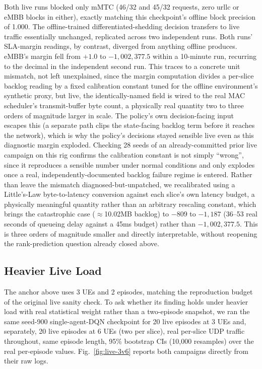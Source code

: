 \documentclass[pdflatex,sn-basic,Numbered]{sn-jnl}%
\begin{document}
Both live runs blocked only mMTC (46/32 and 45/32 requests, zero urllc or eMBB blocks in either), exactly matching this checkpoint's offline block precision of 1.000. The offline-trained differentiated-shedding decision transfers to live traffic essentially unchanged, replicated across two independent runs. Both runs' SLA-margin readings, by contrast, diverged from anything offline produces. eMBB's margin fell from $+1.0$ to $-1{,}002{,}377.5$ within a 10-minute run, recurring to the decimal in the independent second run. This traces to a concrete unit mismatch, not left unexplained, since the margin computation divides a per-slice backlog reading by a fixed calibration constant tuned for the offline environment's synthetic proxy, but live, the identically-named field is wired to the real MAC scheduler's transmit-buffer byte count, a physically real quantity two to three orders of magnitude larger in scale. The policy's own decision-facing
input escapes this (a separate path clips the state-facing backlog
term before it reaches the network), which is why the policy's
decisions stayed sensible live even as this diagnostic margin
exploded. Checking 28 seeds of an already-committed prior live campaign on this rig confirms the calibration constant is not simply ``wrong'', since it reproduces a sensible number under normal conditions and only explodes once a real, independently-documented backlog failure regime is entered. Rather than leave the mismatch diagnosed-but-unpatched, we recalibrated using a Little's-Law byte-to-latency conversion against each slice's own latency budget, a physically meaningful quantity rather than an arbitrary rescaling constant, which brings the catastrophic case ($\approx$10.02MB backlog) to $-809$ to $-1{,}187$ (36--53 real seconds of queueing delay against a 45ms budget) rather than $-1{,}002{,}377.5$. This is three orders of magnitude smaller and directly interpretable, without reopening the rank-prediction question already closed above.

\subsection{Heavier Live Load}
\label{sec:results-m8-load}
The anchor above uses 3 UEs and 2 episodes, matching the reproduction budget of the original live sanity check. To ask whether its finding holds under heavier load with real statistical weight rather than a two-episode snapshot, we ran the same seed-900 single-agent-DQN checkpoint for 20 live episodes at 3 UEs and, separately, 20 live episodes at 6 UEs (two per slice), real per-slice UDP traffic throughout, same episode length, 95\% bootstrap CIs (10{,}000 resamples) over the real per-episode values. Fig.~\ref{fig:live-3v6} reports both campaigns directly from their raw logs.
\end{document}
